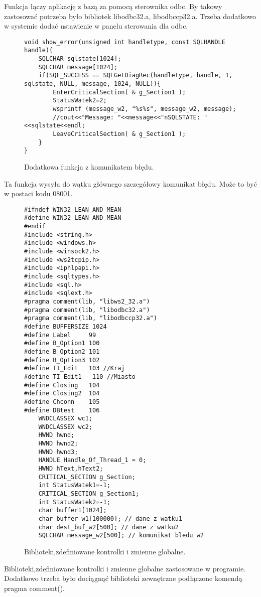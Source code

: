 \documentclass[a4paper,twoside,12pt]{mgr}
\begin{document}
Funkcja łączy aplikację z bazą za pomocą sterownika odbc. By takowy zastosować potrzeba było bibliotek libodbc32.a, libodbccp32.a. Trzeba dodatkowo w systemie dodać ustawienie w panelu sterowania dla odbc.
\begin{figure}[H]
\centering
\begin{lstlisting}[frame=single]  
void show_error(unsigned int handletype, const SQLHANDLE handle){
    SQLCHAR sqlstate[1024];
    SQLCHAR message[1024];
    if(SQL_SUCCESS == SQLGetDiagRec(handletype, handle, 1, sqlstate, NULL, message, 1024, NULL)){
    	EnterCriticalSection( & g_Section1 );
    	StatusWatek2=2;
    	wsprintf (message_w2, "%s%s", message_w2, message);
        //cout<<"Message: "<<message<<"nSQLSTATE: "<<sqlstate<<endl;
        LeaveCriticalSection( & g_Section1 );
	}	
}  
\end{lstlisting}
\caption{Dodatkowa funkcja z komunikatem błędu.}%
\label{rys:etykieta}
\end{figure}
Ta funkcja wysyła do wątku głównego szczegółowy komunikat błędu. Może to być w postaci kodu 08001.
\begin{figure}[H]
\centering
\begin{lstlisting}[frame=single]  
#ifndef WIN32_LEAN_AND_MEAN
#define WIN32_LEAN_AND_MEAN
#endif
#include <string.h>
#include <windows.h>
#include <winsock2.h>
#include <ws2tcpip.h>
#include <iphlpapi.h>
#include <sqltypes.h>
#include <sql.h> 
#include <sqlext.h>
#pragma comment(lib, "libws2_32.a")
#pragma comment(lib, "libodbc32.a")
#pragma comment(lib, "libodbccp32.a")
#define BUFFERSIZE 1024
#define Label 	  99
#define B_Option1 100
#define B_Option2 101
#define B_Option3 102
#define TI_Edit   103 //Kraj
#define TI_Edit1   110 //Miasto
#define Closing   104
#define Closing2  104
#define Chconn    105
#define DBtest    106
	WNDCLASSEX wc1;
	WNDCLASSEX wc2;
	HWND hwnd;
	HWND hwnd2;
	HWND hwnd3;
	HANDLE Handle_Of_Thread_1 = 0;
	HWND hText,hText2;
	CRITICAL_SECTION g_Section;
	int StatusWatek1=-1;   
	CRITICAL_SECTION g_Section1;
	int StatusWatek2=-1;		
	char buffer1[1024];
	char buffer_w1[100000]; // dane z watku1 
	char dest_buf_w2[500]; // dane z watku2
	SQLCHAR message_w2[500]; // komunikat bledu w2
\end{lstlisting}
\caption{Biblioteki,zdefiniowane kontrolki i zmienne globalne.}%
\label{rys:etykieta}
\end{figure}

Biblioteki,zdefiniowane kontrolki i zmienne globalne zastosowane w programie. Dodatkowo trzeba było dociągnąć biblioteki zewnętrzne podłączone komendą pragma comment().
\end{document}
